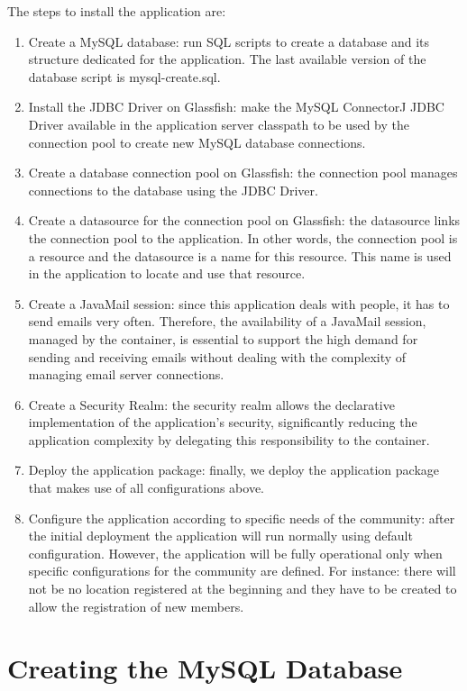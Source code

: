 \documentclass[envcountsame,envcountchap]{svmono}
\begin{document}
The steps to install the application are:

\begin{enumerate}
\item Create a MySQL database: run SQL scripts to create a database and its structure dedicated for the application. The last available version of the database script is mysql-create.sql.
\item Install the JDBC Driver on Glassfish: make the MySQL ConnectorJ JDBC Driver available in the application server classpath to be used by the connection pool to create new MySQL database connections.
\item Create a database connection pool on Glassfish: the connection pool manages connections to the database using the JDBC Driver.
\item Create a datasource for the connection pool on Glassfish: the datasource links the connection pool to the application. In other words, the connection pool is a resource and the datasource is a name for this resource. This name is used in the application to locate and use that resource.
\item Create a JavaMail session: since this application deals with people, it has to send emails very often. Therefore, the availability of a JavaMail session, managed by the container, is essential to support the high demand for sending and receiving emails without dealing with the complexity of managing email server connections.
\item Create a Security Realm: the security realm allows the declarative implementation of the application's security, significantly reducing the application complexity by delegating this responsibility to the container.
\item Deploy the application package: finally, we deploy the application package that makes use of all configurations above.
\item Configure the application according to specific needs of the community: after the initial deployment the application will run normally using default configuration. However, the application will be fully operational only when specific configurations for the community are defined. For instance: there will not be no location registered at the beginning and they have to be created to allow the registration of new members.
\end{enumerate}

\section{Creating the MySQL Database}
\end{document}
